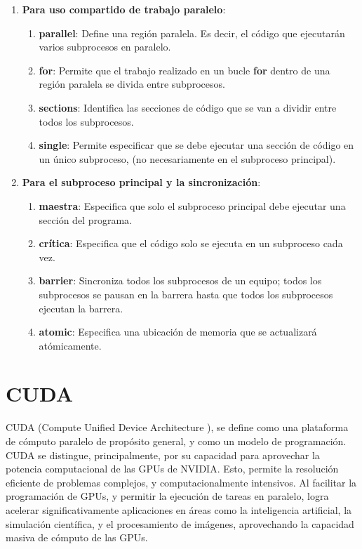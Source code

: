\begin{enumerate}[label=\textbullet]
	\item \textbf{Para uso compartido de trabajo paralelo}:
	\begin{enumerate}[label=\textbullet]
		\item \textbf{parallel}: Define una región paralela. Es decir, el código que ejecutarán varios subprocesos en paralelo.
		\item \textbf{for}: Permite que el trabajo realizado en un bucle \textbf{for} dentro de una región paralela se divida entre subprocesos.
		\item \textbf{sections}: Identifica las secciones de código que se van a dividir entre todos los subprocesos.
		\item \textbf{single}: Permite especificar que se debe ejecutar una sección de código en un único subproceso, (no necesariamente en el subproceso principal).
	\end{enumerate}
	\item \textbf{Para el subproceso principal y la sincronización}:
	\begin{enumerate}[label=\textbullet]
		\item \textbf{maestra}: Especifica que solo el subproceso principal debe ejecutar una sección del programa.
		\item \textbf{crítica}: Especifica que el código solo se ejecuta en un subproceso cada vez.
		\item \textbf{barrier}: Sincroniza todos los subprocesos de un equipo; todos los subprocesos se pausan en la barrera hasta que todos los subprocesos ejecutan la barrera.
		\item \textbf{atomic}: Especifica una ubicación de memoria que se actualizará atómicamente.
	\end{enumerate}
\end{enumerate}


\section{CUDA}


CUDA (Compute Unified Device Architecture \cite{cuda_forum}), se define como una plataforma de cómputo paralelo de propósito general, y como un modelo de programación. 
CUDA se distingue, principalmente, por su capacidad para aprovechar la potencia computacional de las GPUs de NVIDIA. Esto, permite la resolución eficiente de problemas complejos, y computacionalmente intensivos. 
Al facilitar la programación de GPUs, y permitir la ejecución de tareas en paralelo, logra acelerar significativamente aplicaciones en áreas como la inteligencia artificial, la simulación científica, y el procesamiento de imágenes, aprovechando la capacidad masiva de cómputo de las GPUs. \\

